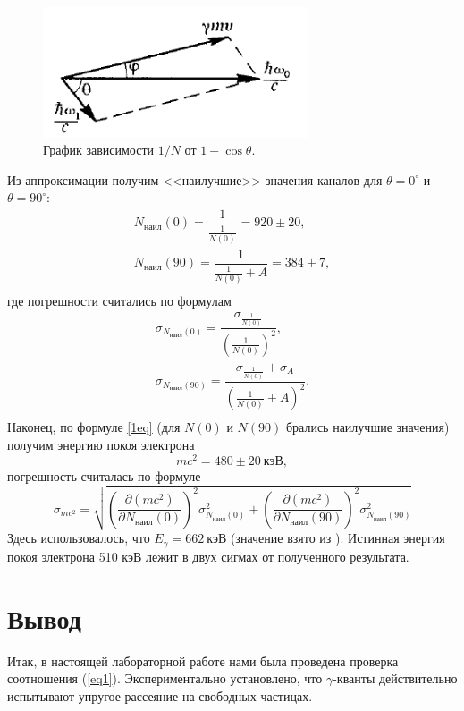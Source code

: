 \documentclass[a4paper, 12pt]{article}%
\begin{document}
\begin{figure}[h]
\includegraphics[width = 0.7\textwidth]{fig1.png}
\centering
\caption{График зависимости $1/N$ от $1-\cos \theta$.}
\end{figure}


Из аппроксимации получим <<наилучшие>> значения каналов для $\theta = 0^\circ$ и $\theta = 90^\circ$:
\[\begin{array}{l}
N_{\text{наил}}(0) = \dfrac{1}{\frac{1}{N(0)}} = 920 \pm 20,\\[12pt]
N_{\text{наил}}(90) = \dfrac{1}{\frac{1}{N(0)}+A} = 384 \pm 7,\\
\end{array}
\]
где погрешности считались по формулам
\[
\begin{array}{l}
\sigma_{N_{\text{наил}}(0)} = \dfrac{\sigma_{\frac{1}{N(0)}}}{(\frac{1}{N(0)})^2},\\[14pt]
\sigma_{N_{\text{наил}}(90)} = \dfrac{\sigma_{\frac{1}{N(0)}} + \sigma_{A}}{(\frac{1}{N(0)}+A)^2}.\\
\end{array}
\]
Наконец, по формуле \ref{1eq} (для $N(0)$ и $N(90)$ брались наилучшие значения) получим энергию покоя электрона
\[mc^2 = 480 \pm 20~\text{кэВ},\]
погрешность считалась по формуле
\[\sigma_{mc^2} = \sqrt{ \left( \dfrac{\partial (mc^2)}{\partial N_{\text{наил}}(0)} \right)^2 \sigma_{N_{\text{наил}}(0)}^2 +\left( \dfrac{\partial (mc^2)}{\partial N_{\text{наил}}(90)} \right)^2 \sigma_{N_{\text{наил}}(90)}^2 }\]
Здесь использовалось, что $E_\gamma = 662~\text{кэВ}$ (значение взято из \cite{laba}). Истинная энергия покоя электрона 510 кэВ лежит в двух сигмах от полученного результата.

\section{Вывод}

Итак, в настоящей лабораторной работе нами была проведена проверка соотношения (\ref{eq1}). Экспериментально установлено, что $\gamma$-кванты действительно испытывают упругое рассеяние на свободных частицах. 
	
\end{document}
